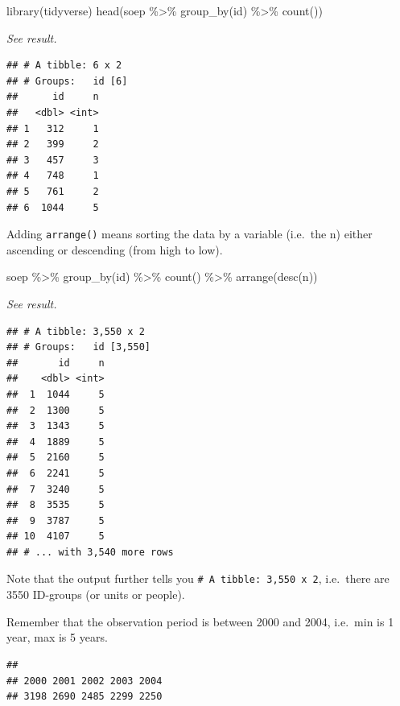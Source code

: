 \documentclass[
]{book}
\newenvironment{Shaded}{\begin{snugshade}}{\end{snugshade}}
\newcommand{\FunctionTok}[1]{\textcolor[rgb]{0.00,0.00,0.00}{#1}}
\newcommand{\NormalTok}[1]{#1}
\newcommand{\SpecialCharTok}[1]{\textcolor[rgb]{0.00,0.00,0.00}{#1}}
\begin{document}
\begin{Shaded}
\begin{Highlighting}[]
\FunctionTok{library}\NormalTok{(tidyverse)}
\FunctionTok{head}\NormalTok{(soep }\SpecialCharTok{\%\textgreater{}\%} \FunctionTok{group\_by}\NormalTok{(id) }\SpecialCharTok{\%\textgreater{}\%} \FunctionTok{count}\NormalTok{()) }
\end{Highlighting}
\end{Shaded}

\emph{See result.}

\begin{verbatim}
## # A tibble: 6 x 2
## # Groups:   id [6]
##      id     n
##   <dbl> <int>
## 1   312     1
## 2   399     2
## 3   457     3
## 4   748     1
## 5   761     2
## 6  1044     5
\end{verbatim}

Adding \texttt{arrange()} means sorting the data by a variable (i.e.~the n) either ascending or descending (from high to low).

\begin{Shaded}
\begin{Highlighting}[]
\NormalTok{soep }\SpecialCharTok{\%\textgreater{}\%} \FunctionTok{group\_by}\NormalTok{(id) }\SpecialCharTok{\%\textgreater{}\%} \FunctionTok{count}\NormalTok{() }\SpecialCharTok{\%\textgreater{}\%} \FunctionTok{arrange}\NormalTok{(}\FunctionTok{desc}\NormalTok{(n)) }
\end{Highlighting}
\end{Shaded}

\emph{See result.}

\begin{verbatim}
## # A tibble: 3,550 x 2
## # Groups:   id [3,550]
##       id     n
##    <dbl> <int>
##  1  1044     5
##  2  1300     5
##  3  1343     5
##  4  1889     5
##  5  2160     5
##  6  2241     5
##  7  3240     5
##  8  3535     5
##  9  3787     5
## 10  4107     5
## # ... with 3,540 more rows
\end{verbatim}

Note that the output further tells you \texttt{\#\ A\ tibble:\ 3,550\ x\ 2}, i.e.~there are 3550 ID-groups (or units or people).

Remember that the observation period is between 2000 and 2004, i.e.~min is 1 year, max is 5 years.

\begin{verbatim}
## 
## 2000 2001 2002 2003 2004 
## 3198 2690 2485 2299 2250
\end{verbatim}
\end{document}
